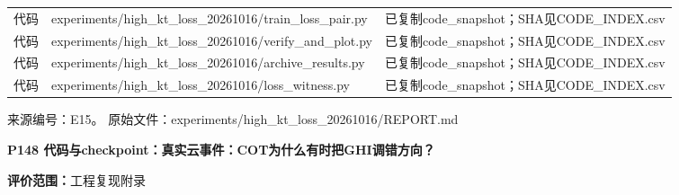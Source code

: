\documentclass[UTF8,a4paper,landscape,10pt]{ctexart}
\begin{document}
\begin{center}
\begin{adjustbox}{max totalheight=0.58\textheight,max width=\linewidth}
\begin{minipage}{\linewidth}
\begin{tabularx}{\linewidth}{>{\hsize=0.3500\hsize\raggedright\arraybackslash}X>{\hsize=1.9000\hsize\raggedright\arraybackslash}X>{\hsize=0.7500\hsize\raggedright\arraybackslash}X}
代码 & experiments/\allowbreak{}high\_\allowbreak{}kt\_\allowbreak{}loss\_\allowbreak{}20261016/\allowbreak{}train\_\allowbreak{}loss\_\allowbreak{}pair.py & 已复制code\_\allowbreak{}snapshot；SHA见CODE\_\allowbreak{}INDEX.csv \\
代码 & experiments/\allowbreak{}high\_\allowbreak{}kt\_\allowbreak{}loss\_\allowbreak{}20261016/\allowbreak{}verify\_\allowbreak{}and\_\allowbreak{}plot.py & 已复制code\_\allowbreak{}snapshot；SHA见CODE\_\allowbreak{}INDEX.csv \\
代码 & experiments/\allowbreak{}high\_\allowbreak{}kt\_\allowbreak{}loss\_\allowbreak{}20261016/\allowbreak{}archive\_\allowbreak{}results.py & 已复制code\_\allowbreak{}snapshot；SHA见CODE\_\allowbreak{}INDEX.csv \\
代码 & experiments/\allowbreak{}high\_\allowbreak{}kt\_\allowbreak{}loss\_\allowbreak{}20261016/\allowbreak{}loss\_\allowbreak{}witness.py & 已复制code\_\allowbreak{}snapshot；SHA见CODE\_\allowbreak{}INDEX.csv \\
\bottomrule\end{tabularx}\end{minipage}\end{adjustbox}\end{center}
\vfill{\scriptsize\color{muted} 来源编号：E15。 原始文件：experiments/\allowbreak{}high\_\allowbreak{}kt\_\allowbreak{}loss\_\allowbreak{}20261016/\allowbreak{}REPORT.md}\par
\clearpage
{\large\bfseries\color{ink} P148  代码与checkpoint：真实云事件：COT为什么有时把GHI调错方向？}\par
{}\par
{\small\color{muted}\textbf{评价范围：}工程复现附录}\par\vspace{3mm}
\end{document}
